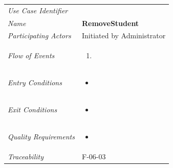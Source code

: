 \documentclass[12pt,letterpaper]{article}
\begin{document}
\begin{center}
	\begin{tabu} to 
		\toprule
		Use Case Identifier & \removestudent{} \\
		Name & {\bf RemoveStudent} \\
		Participating Actors & Initiated by Administrator \\
		Flow of Events & 
	    \begin{enumerate}[topsep=-1em,leftmargin=*]
		    \item 
		\end{enumerate} \\

		Entry Conditions &
		\begin{itemize}[topsep=-1em,leftmargin=*]
		    \item 
        \end{itemize} \\

		Exit Conditions &
		\begin{itemize}[topsep=-1em,leftmargin=*]
		    \item 
        \end{itemize} \\

		Quality Requirements &
		\begin{itemize}[topsep=-1em,leftmargin=*]
		    \item 
        \end{itemize} \\

		Traceability & F-06-03 \\
		\toprule
	\end{tabu}
\end{center}
\end{document}

